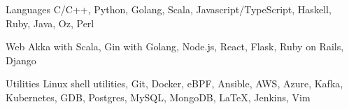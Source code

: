 

\begin{cvskills}


  \cvskill
  {Languages}
  {C/C++, Python, Golang, Scala, Javascript/TypeScript, Haskell, Ruby, Java, Oz, Perl}


  \cvskill
  {Web}
  {Akka with Scala, Gin with Golang, Node.js, React, Flask, Ruby on Rails, Django}


  \cvskill
  {Utilities}
  {Linux shell utilities, Git, Docker, eBPF, Ansible, AWS, Azure, Kafka, Kubernetes, GDB, Postgres, MySQL, MongoDB, \LaTeX, Jenkins, Vim}




\end{cvskills}
